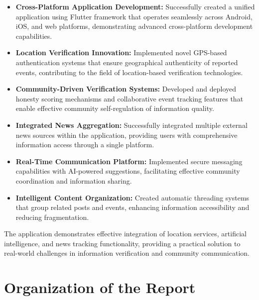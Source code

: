 \begin{itemize}
    \item \textbf{Cross-Platform Application Development:} Successfully created a unified application using Flutter framework that operates seamlessly across Android, iOS, and web platforms, demonstrating advanced cross-platform development capabilities.
    
    \item \textbf{Location Verification Innovation:} Implemented novel GPS-based authentication systems that ensure geographical authenticity of reported events, contributing to the field of location-based verification technologies.
    
    \item \textbf{Community-Driven Verification Systems:} Developed and deployed honesty scoring mechanisms and collaborative event tracking features that enable effective community self-regulation of information quality.
    
    \item \textbf{Integrated News Aggregation:} Successfully integrated multiple external news sources within the application, providing users with comprehensive information access through a single platform.
    
    \item \textbf{Real-Time Communication Platform:} Implemented secure messaging capabilities with AI-powered suggestions, facilitating effective community coordination and information sharing.
    
    \item \textbf{Intelligent Content Organization:} Created automatic threading systems that group related posts and events, enhancing information accessibility and reducing fragmentation.
\end{itemize}

The application demonstrates effective integration of location services, artificial intelligence, and news tracking functionality, providing a practical solution to real-world challenges in information verification and community communication.

\section{Organization of the Report}
\label{sec:intro_org}

